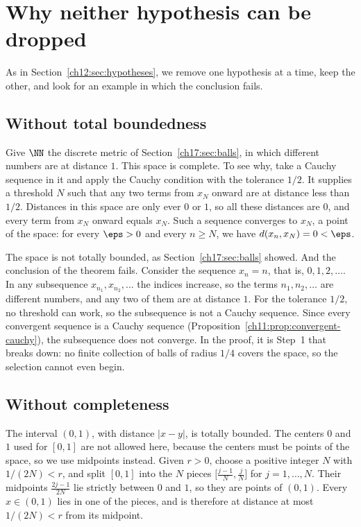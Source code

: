 \section{Why neither hypothesis can be dropped}\label{ch17:sec:counterexamples}
As in Section~\ref{ch12:sec:hypotheses}, we remove one hypothesis at a time, keep the other, and look for an example in which the conclusion fails.

\subsection*{Without total boundedness}
Give $\NN$ the discrete metric of Section~\ref{ch17:sec:balls}, in which different numbers are at distance $1$. This space is complete. To see why, take a Cauchy sequence in it and apply the Cauchy condition with the tolerance $1/2$. It supplies a threshold $N$ such that any two terms from $x_N$ onward are at distance less than $1/2$. Distances in this space are only ever $0$ or $1$, so all these distances are $0$, and every term from $x_N$ onward equals $x_N$. Such a sequence converges to $x_N$, a point of the space: for every $\eps>0$ and every $n\ge N$, we have $d(x_n,x_N)=0<\eps$.

The space is not totally bounded, as Section~\ref{ch17:sec:balls} showed. And the conclusion of the theorem fails. Consider the sequence $x_n=n$, that is, $0,1,2,\ldots$. In any subsequence $x_{n_1},x_{n_2},\ldots$ the indices increase, so the terms $n_1,n_2,\ldots$ are different numbers, and any two of them are at distance $1$. For the tolerance $1/2$, no threshold can work, so the subsequence is not a Cauchy sequence. Since every convergent sequence is a Cauchy sequence (Proposition~\ref{ch11:prop:convergent-cauchy}), the subsequence does not converge. In the proof, it is Step~1 that breaks down: no finite collection of balls of radius $1/4$ covers the space, so the selection cannot even begin.

\subsection*{Without completeness}
The interval $(0,1)$, with distance $|x-y|$, is totally bounded. The centers $0$ and $1$ used for $[0,1]$ are not allowed here, because the centers must be points of the space, so we use midpoints instead. Given $r>0$, choose a positive integer $N$ with $1/(2N)<r$, and split $[0,1]$ into the $N$ pieces $\bigl[\tfrac{j-1}N,\tfrac jN\bigr]$ for $j=1,\ldots,N$. Their midpoints $\tfrac{2j-1}{2N}$ lie strictly between $0$ and $1$, so they are points of $(0,1)$. Every $x\in(0,1)$ lies in one of the pieces, and is therefore at distance at most $1/(2N)<r$ from its midpoint.

